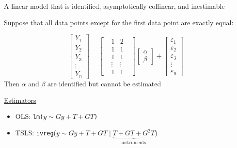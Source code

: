 \documentclass[aspectratio=169]{beamer}
\theoremstyle{remark}
\begin{document}
\begin{frame}{A linear model that is identified, asymptotically collinear, and inestimable}
    
    Suppose that all data points except for the first data point are exactly equal:
    
    \begin{equation*}
        \begin{bmatrix}
            Y_1    \\
            Y_2    \\
            Y_3    \\
            \vdots \\
            Y_n
        \end{bmatrix}
        =
        \begin{bmatrix}
             & 1      & 2      &   \\
             & 1      & 1      &   \\
             & 1      & 1      &   \\
             & \vdots & \vdots &   \\
             & 1      & 1      & 
        \end{bmatrix}
        \begin{bmatrix}
            \alpha \\
            \beta
        \end{bmatrix}
        +
        \begin{bmatrix}
            \varepsilon_1 \\
            \varepsilon_2 \\
            \varepsilon_3 \\
            \vdots        \\
            \varepsilon_n
        \end{bmatrix}
    \end{equation*}
    Then $\alpha$ and $\beta$ are identified but cannot be estimated
\end{frame}

\begin{frame}
    \underline{Estimators}
    \begin{itemize}
        \setlength\itemsep{1.25em}
        \item OLS: \texttt{lm($y \sim Gy + T + GT$)}
        \item TSLS: \texttt{ivreg}($y \sim Gy + T + GT \mid \underbrace{T + GT + G^2T}_\text{instruments}$)
    \end{itemize}
\end{frame}
\end{document}
